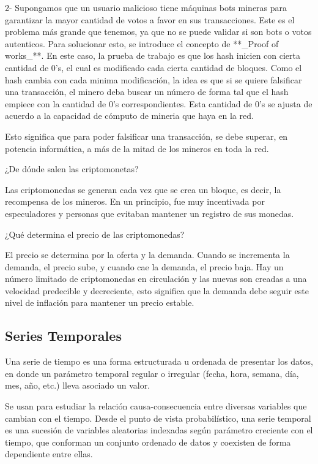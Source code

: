 \documentclass[a4paper,10pt]{article}
\begin{document}
 2- Supongamos que un usuario malicioso tiene máquinas bots mineras para garantizar la mayor cantidad de votos a favor en sus transacciones. Este es el problema más grande que tenemos, ya que no se puede validar si son bots o votos autenticos. Para solucionar esto, se introduce el concepto de **\_Proof of works\_**. En este caso, la prueba de trabajo es que los hash inicien con cierta cantidad de 0's, el cual es modificado cada cierta cantidad de bloques.
Como el hash cambia con cada minima modificación, la idea es que si se quiere falsificar una transacción, el minero deba buscar un número de forma tal que el hash empiece con la cantidad de 0's correspondientes. Esta cantidad de 0's se ajusta de acuerdo a la capacidad de cómputo de mineria que haya en la red.

Esto significa que para poder falsificar una transacción, se debe superar, en potencia informática, a más de la mitad de los mineros en toda la red.

 ¿De dónde salen las criptomonetas?

 Las criptomonedas se generan cada vez que se crea un bloque, es decir, la recompensa de los mineros. En un principio, fue muy incentivada por especuladores y personas que evitaban mantener un registro de sus monedas.

 ¿Qué determina el precio de las criptomonedas?

 El precio se determina por la oferta y la demanda. Cuando se incrementa la demanda, el precio sube, y cuando cae la demanda, el precio baja. Hay un número limitado de criptomonedas en circulación y las nuevas son creadas a una velocidad predecible y decreciente, esto significa que la demanda debe seguir este nivel de inflación para mantener un precio estable.

\bigskip

\bigskip

\subsection{Series Temporales}

Una serie de tiempo es una forma estructurada u ordenada de presentar los datos, en donde un parámetro temporal regular o irregular (fecha, hora, semana, día, mes, año, etc.) lleva asociado un valor.

Se usan para estudiar la relación causa-consecuencia entre diversas variables que cambian con el tiempo. Desde el punto de vista probabilístico, una serie temporal es una sucesión de variables aleatorias indexadas según parámetro creciente con el tiempo, que conforman un conjunto ordenado de datos y coexisten de forma dependiente entre ellas.
\end{document}

